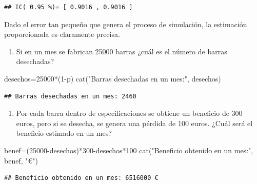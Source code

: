 \documentclass[
]{book}
\newenvironment{Shaded}{\begin{snugshade}}{\end{snugshade}}
\newcommand{\DecValTok}[1]{\textcolor[rgb]{0.00,0.00,0.81}{#1}}
\newcommand{\FunctionTok}[1]{\textcolor[rgb]{0.00,0.00,0.00}{#1}}
\newcommand{\NormalTok}[1]{#1}
\newcommand{\OtherTok}[1]{\textcolor[rgb]{0.56,0.35,0.01}{#1}}
\newcommand{\SpecialCharTok}[1]{\textcolor[rgb]{0.00,0.00,0.00}{#1}}
\newcommand{\StringTok}[1]{\textcolor[rgb]{0.31,0.60,0.02}{#1}}
\providecommand{\tightlist}{%
  \setlength{\itemsep}{0pt}\setlength{\parskip}{0pt}}
\theoremstyle{definition}
\theoremstyle{definition}
\theoremstyle{definition}
\theoremstyle{definition}
\theoremstyle{remark}
\begin{document}
\begin{verbatim}
## IC( 0.95 %)= [ 0.9016 , 0.9016 ]
\end{verbatim}

Dado el error tan pequeño que genera el proceso de simulación, la estimación proporcionada es claramente precisa.

\begin{enumerate}
\def\labelenumi{\arabic{enumi}.}
\setcounter{enumi}{1}
\tightlist
\item
  Si en un mes se fabrican 25000 barras ¿cuál es el número de barras desechadas?
\end{enumerate}

\begin{Shaded}
\begin{Highlighting}[]
\NormalTok{desechos}\OtherTok{=}\DecValTok{25000}\SpecialCharTok{*}\NormalTok{(}\DecValTok{1}\SpecialCharTok{{-}}\NormalTok{p)}
\FunctionTok{cat}\NormalTok{(}\StringTok{"Barras desechadas en un mes:"}\NormalTok{, desechos)}
\end{Highlighting}
\end{Shaded}

\begin{verbatim}
## Barras desechadas en un mes: 2460
\end{verbatim}

\begin{enumerate}
\def\labelenumi{\arabic{enumi}.}
\setcounter{enumi}{2}
\tightlist
\item
  Por cada barra dentro de especificaciones se obtiene un beneficio de 300 euros, pero si se desecha, se genera una pérdida de 100 euros. ¿Cuál será el beneficio estimado en un mes?
\end{enumerate}

\begin{Shaded}
\begin{Highlighting}[]
\NormalTok{benef}\OtherTok{=}\NormalTok{(}\DecValTok{25000}\SpecialCharTok{{-}}\NormalTok{desechos)}\SpecialCharTok{*}\DecValTok{300}\SpecialCharTok{{-}}\NormalTok{desechos}\SpecialCharTok{*}\DecValTok{100}
\FunctionTok{cat}\NormalTok{(}\StringTok{"Beneficio obtenido en un mes:"}\NormalTok{, benef, }\StringTok{"€"}\NormalTok{)}
\end{Highlighting}
\end{Shaded}

\begin{verbatim}
## Beneficio obtenido en un mes: 6516000 €
\end{verbatim}
\end{document}
